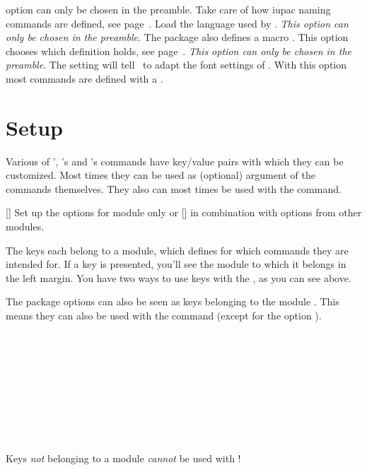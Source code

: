 \documentclass[load-preamble+]{cnltx-doc}
\begin{document}
\begin{options}
{      option can only be chosen in the preamble}.
    Take care of how \ac{iupac} naming commands are defined, see
    page~\pageref{desc:iupac}.
    \Default
    Load the language used by \chemmacros.  \emph{This option can only be
      chosen in the preamble}.
    The package  also defines a macro .  This option
    chooses which definition holds, see page~\pageref{Nu}.  \emph{This option
      can only be chosen in the preamble}.
    The setting  will tell \chemmacros\ to adapt the font settings
    of \chemformula.
    With this option most commands are defined with a .
\end{options}


\section{Setup}\label{sec:setup}
Various of \chemmacros', \chemformula's and \ghsystem's commands have
key/value pairs with which they can be customized.  Most times they can be
used as (optional) argument of the commands themselves.  They also can most
times be used with the  command.
\begin{commands}
  []
    Set up the options for module  only or
  []
    in combination with options from other modules.
\end{commands}
The keys each belong to a module, which defines for which commands they are
intended for.  If a key is presented, you'll see the module to which it
belongs in the left margin.  You have two ways to use keys with the
, as you can see above.

The package options can also be seen as keys belonging to the module
.  This means they can also be used with the 
command (except for the option ).
\begin{example}
    \leavevmode\mch\ \pch\ \fmch\ \fpch\ \el\ \prt \par
    \leavevmode\mch\ \pch\ \fmch\ \fpch\ \el\ \prt \par
    \leavevmode\mch\ \pch\ \fmch\ \fpch\ \el\ \prt \par
    \leavevmode\mch\ \pch\ \fmch\ \fpch\ \el\ \prt \par
    \leavevmode\mch\ \pch\ \fmch\ \fpch\ \el\ \prt
\end{example}
Keys \emph{not} belonging to a module \emph{cannot} be used with
!
\end{document}

